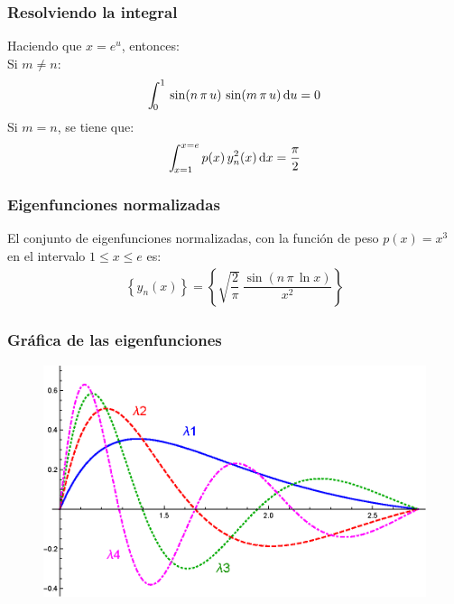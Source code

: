 \documentclass[12pt]{beamer}
\begin{document}
\begin{frame}
\frametitle{Resolviendo la integral}
Haciendo que $x = e^{u}$, entonces:
\\
\pause
Si $m \neq n$:
\pause
\begin{align*}
\scaleint{5ex}_{\bs 0}^{1} \, \sin (n \, \pi  \, u) \, \sin (m \, \pi  \, u) \dd{u} = 0
\end{align*}
\pause
Si $m = n$, se tiene que:
\pause
\begin{align*}
\scaleint{5ex}_{\bs x=1}^{x=e} \, p(x) \, y_{n}^{2} (x) \dd{x} = \dfrac{\pi}{2}
\end{align*}
\end{frame}
\begin{frame}
\frametitle{Eigenfunciones normalizadas}
El conjunto de eigenfunciones normalizadas, con la función de peso $p(x) = x^{3}$ en el intervalo $1 \leq x \leq e$ es:
\begin{align*}
\left\{ y_{n} (x) \right\} = \left\{ \sqrt{\dfrac{2}{\pi}} \, \dfrac{\sin (n \, \pi \, \ln x)}{x^{2}} \right\}
\end{align*}
\end{frame}
\begin{frame}
\frametitle{Gráfica de las eigenfunciones}
\begin{figure}
    \centering
    \includegraphics[scale=0.85]{Imagenes/Ejercicio_SL_01_Funciones.eps}
\end{figure}
\end{frame}
\end{document}
